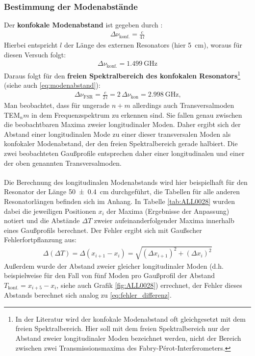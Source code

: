 \documentclass[11pt, a4paper]{article}
\numberwithin{equation}{section}
\begin{document}
\subsubsection{Bestimmung der Modenabstände}
Der \textbf{konfokale Modenabstand} ist gegeben durch \cite{siegman}:
\begin{align}
\Delta\nu_\text{konf.}=\frac{c}{4\,l}
\end{align}
Hierbei entspricht $l$ der Länge des externen Resonators (hier \SI{5}{\centi\metre}), woraus für diesen Versuch folgt:
\begin{align}
\Delta\nu_\text{konf.}=\SI{1.499}{\giga\hertz}
\end{align}
Daraus folgt für den \textbf{freien Spektralbereich des konfokalen Resonators}\footnote{In der Literatur wird der konfokale Modenabstand oft gleichgesetzt mit dem freien Spektralbereich. Hier soll mit dem freien Spektralbereich nur der Abstand zweier longitudinaler Moden bezeichnet werden, nicht der Bereich zwischen zwei Transmissionsmaxima des Fabry-Pérot-Interferometers.} (siehe auch \eqref{eq:modenabstand}):
\begin{align}
\Delta\nu_\text{FSR}=\frac{c}{2\,l}=2\,\Delta\nu_\text{kon}=\SI{2.998}{\giga\hertz} \text{,}
\end{align}
Man beobachtet, dass für ungerade $n+m$ allerdings auch Transversalmoden TEM$_nm$ in dem Frequenzspektrum zu erkennen sind.
Sie fallen genau zwischen die beobachtbaren Maxima zweier longitudinaler Moden.
Daher ergibt sich der Abstand einer longitudinalen Mode zu einer dieser transversalen Moden als konfokaler Modenabstand, der den freien Spektralbereich gerade halbiert.
Die zwei beobachteten Gaußprofile entsprechen daher einer longitudinalen und einer der oben genannten Transversalmoden.\\
\\
Die Berechnung des longitudinalen Modenabstands wird hier beispielhaft für den Resonator der Länge \SI{50+-0.4}{\centi\metre} durchgeführt, die Tabellen für alle anderen Resonatorlängen befinden sich im Anhang.
In Tabelle \ref{tab:ALL0028} wurden dabei die jeweiligen Positionen $x_i$ der Maxima (Ergebnisse der Anpassung) notiert und die Abstände $\Delta T$ zweier aufeinanderfolgender Maxima innerhalb eines Gaußprofils berechnet.
Der Fehler ergibt sich mit Gaußscher Fehlerfortpflanzung aus:
\begin{align}
\Delta(\Delta T)=\Delta(x_{i+1}-x_i)=\sqrt{(\Delta x_{i+1})^2+(\Delta x_i)^2}
\label{eq:fehler_differenz}
\end{align}
Außerdem wurde der Abstand zweier gleicher longitudinaler Moden (d.h. beispielweise für den Fall von fünf Moden pro Gaußprofil der Abstand $T_\text{konf.}=x_{i+5}-x_i$, siehe auch Grafik \ref{fig:ALL0028}) errechnet, der Fehler dieses Abstands berechnet sich analog zu \eqref{eq:fehler_differenz}.
\end{document}

